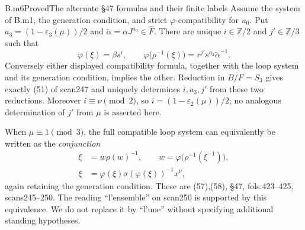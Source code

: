 \begin{claim}{B.m6}{Proved}{The alternate \S47 formulas and their finite labels}
Assume the system of B.m1, the generation condition, and strict $\varphi$-compatibility for $u_0$. Put $a_3=(1-\varepsilon_3(\mu))/2$ and $\widetilde\alpha=\alpha J^{a_3}\in\widehat F$. There are unique $i\in\mathbb Z/2$ and $j'\in\mathbb Z/3$ such that
\[
 \varphi(\xi)=\beta s^i,\qquad
 \varphi\bigl(\rho^{-1}(\xi)\bigr)=r^{j'}s^{a_3}\widetilde\alpha^{-1}.
\]
Conversely either displayed compatibility formula, together with the loop system and its generation condition, implies the other. Reduction in $B/F=S_3$ gives exactly (51) of scan247 and uniquely determines $i,a_3,j'$ from these two reductions. Moreover $i\equiv\nu\pmod2$, so $i=(1-\varepsilon_2(\mu))/2$; no analogous determination of $j'$ from $\mu$ is asserted here.

When $\mu\equiv1\pmod3$, the full compatible loop system can equivalently be written as the \emph{conjunction}
\begin{align*}
 \xi&=w\rho(w)^{-1},\qquad w=\varphi\bigl(\rho^{-1}(\xi^{-1})\bigr),\\
 \xi&=\varphi(\xi)\sigma(\varphi(\xi))^{-1}x^\nu,
\end{align*}
again retaining the generation condition. These are (57),(58), \S47, fols.423--425, scans245--250. The reading ``l'ensemble'' on scan250 is supported by this equivalence. We do not replace it by ``l'une'' without specifying additional standing hypotheses.
\end{claim}
